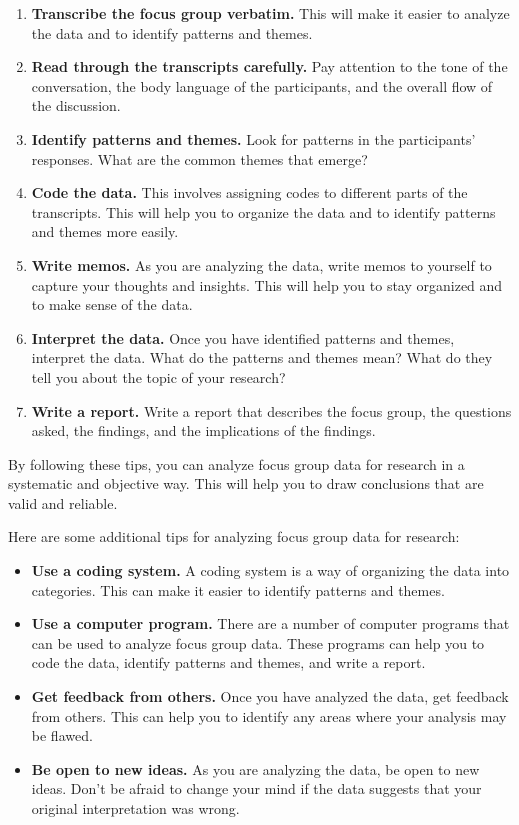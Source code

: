 \documentclass[
  b5paper]{book}
\begin{document}
\begin{enumerate}
\def\labelenumi{\arabic{enumi}.}
\item
  \textbf{Transcribe the focus group verbatim.} This will make it easier to analyze the data and to identify patterns and themes.
\item
  \textbf{Read through the transcripts carefully.} Pay attention to the tone of the conversation, the body language of the participants, and the overall flow of the discussion.
\item
  \textbf{Identify patterns and themes.} Look for patterns in the participants' responses. What are the common themes that emerge?
\item
  \textbf{Code the data.} This involves assigning codes to different parts of the transcripts. This will help you to organize the data and to identify patterns and themes more easily.
\item
  \textbf{Write memos.} As you are analyzing the data, write memos to yourself to capture your thoughts and insights. This will help you to stay organized and to make sense of the data.
\item
  \textbf{Interpret the data.} Once you have identified patterns and themes, interpret the data. What do the patterns and themes mean? What do they tell you about the topic of your research?
\item
  \textbf{Write a report.} Write a report that describes the focus group, the questions asked, the findings, and the implications of the findings.
\end{enumerate}

By following these tips, you can analyze focus group data for research in a systematic and objective way. This will help you to draw conclusions that are valid and reliable.

Here are some additional tips for analyzing focus group data for research:

\begin{itemize}
\item
  \textbf{Use a coding system.} A coding system is a way of organizing the data into categories. This can make it easier to identify patterns and themes.
\item
  \textbf{Use a computer program.} There are a number of computer programs that can be used to analyze focus group data. These programs can help you to code the data, identify patterns and themes, and write a report.
\item
  \textbf{Get feedback from others.} Once you have analyzed the data, get feedback from others. This can help you to identify any areas where your analysis may be flawed.
\item
  \textbf{Be open to new ideas.} As you are analyzing the data, be open to new ideas. Don't be afraid to change your mind if the data suggests that your original interpretation was wrong.
\end{itemize}
\end{document}
